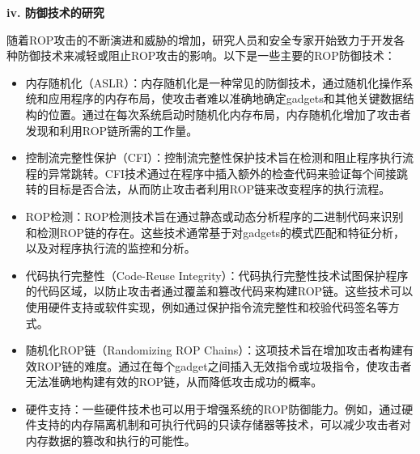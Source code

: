\documentclass[UTF8,12pt,a4paper,twoside]{ctexart}
\numberwithin{figure}{section}
\begin{document}
\textbf{iv. 防御技术的研究}
\par 随着ROP攻击的不断演进和威胁的增加，研究人员和安全专家开始致力于开发各种防御技术来减轻或阻止ROP攻击的影响。以下是一些主要的ROP防御技术：
\begin{itemize}
    \item 内存随机化（ASLR）：内存随机化是一种常见的防御技术，通过随机化操作系统和应用程序的内存布局，使攻击者难以准确地确定gadgets和其他关键数据结构的位置。通过在每次系统启动时随机化内存布局，内存随机化增加了攻击者发现和利用ROP链所需的工作量。
    \item 控制流完整性保护（CFI）：控制流完整性保护技术旨在检测和阻止程序执行流程的异常跳转。CFI技术通过在程序中插入额外的检查代码来验证每个间接跳转的目标是否合法，从而防止攻击者利用ROP链来改变程序的执行流程。
    \item ROP检测：ROP检测技术旨在通过静态或动态分析程序的二进制代码来识别和检测ROP链的存在。这些技术通常基于对gadgets的模式匹配和特征分析，以及对程序执行流的监控和分析。
    \item 代码执行完整性（Code-Reuse Integrity）：代码执行完整性技术试图保护程序的代码区域，以防止攻击者通过覆盖和篡改代码来构建ROP链。这些技术可以使用硬件支持或软件实现，例如通过保护指令流完整性和校验代码签名等方式。
    \item 随机化ROP链（Randomizing ROP Chains）：这项技术旨在增加攻击者构建有效ROP链的难度。通过在每个gadget之间插入无效指令或垃圾指令，使攻击者无法准确地构建有效的ROP链，从而降低攻击成功的概率。
    \item 硬件支持：一些硬件技术也可以用于增强系统的ROP防御能力。例如，通过硬件支持的内存隔离机制和可执行代码的只读存储器等技术，可以减少攻击者对内存数据的篡改和执行的可能性。
\end{itemize}
\end{document}
